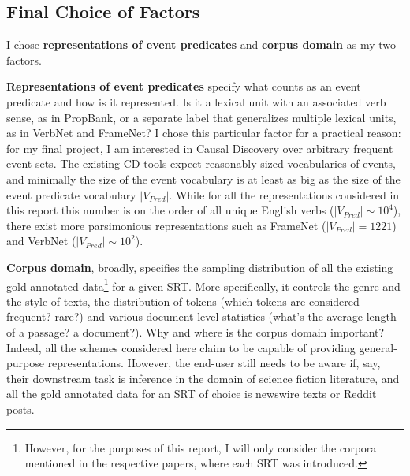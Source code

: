 \documentclass[11pt,a4paper]{article}
\begin{document}
\subsection{Final Choice of Factors}
I chose \textbf{representations of event predicates} and \textbf{corpus domain} as my two factors.


\textbf{Representations of event predicates} specify what counts as an event predicate and how is it represented. Is it a lexical unit with an associated verb sense, as in PropBank, or a separate label that generalizes multiple lexical units, as in VerbNet and FrameNet? I chose this particular factor for a practical reason: for my final project, I am interested in Causal Discovery over arbitrary frequent event sets. The existing CD tools expect reasonably sized vocabularies of events, and minimally the size of the event vocabulary is at least as big as the size of the event predicate vocabulary $|V_{Pred}|$. While for all the representations considered in this report this number is on the order of all unique English verbs ($|V_{Pred}| \sim 10^4$), there exist more parsimonious representations such as FrameNet ($|V_{Pred}| = 1221$) and VerbNet ($|V_{Pred}| \sim 10^2$).

\textbf{Corpus domain}, broadly, specifies the sampling distribution of all the existing gold annotated data\footnote{However, for the purposes of this report, I will only consider the corpora mentioned in the respective papers, where each SRT was introduced.} for a given SRT. More specifically, it controls the genre and the style of texts, the distribution of tokens (which tokens are considered frequent? rare?) and various document-level statistics (what's the average length of a passage? a document?). Why and where is the corpus domain important? 
Indeed, all the schemes considered here claim to be capable of providing general-purpose representations. However, the end-user still needs to be aware if, say, their downstream task is inference in the domain of science fiction literature, and all the gold annotated data for an SRT of choice is newswire texts or Reddit posts.
\end{document}
